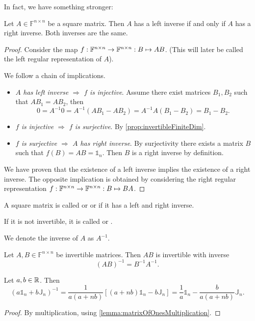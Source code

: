 In fact, we have something stronger:
\begin{lemma}
Let $A\in \mathbb{F}^{n\times n}$ be a square matrix. Then $A$ has a left inverse \textup{if and only if} $A$ has a right inverse. Both inverses are the same.
\end{lemma}
\begin{proof}
Consider the map $f:\mathbb{F}^{n\times n}\to \mathbb{F}^{n\times n}: B\mapsto AB$. (This will later be called the left regular representation of $A$). 
 
We follow a chain of implications.
\begin{itemize}
\item \textit{$A$ has left inverse $\Rightarrow$ $f$ is injective}. Assume there exist matrices $B_1,B_2$ such that $AB_1 = AB_2$, then
\[ 0 = A^{-1}0 = A^{-1}(AB_1-AB_2) = A^{-1}A(B_1-B_2) = B_1-B_2. \]
\item \textit{$f$ is injective $\Rightarrow$ $f$ is surjective}. By \ref{prop:invertibleFiniteDim}.
\item \textit{$f$ is surjective $\Rightarrow$ $A$ has right inverse}. By surjectivity there exists a matrix $B$ such that $f(B) = AB=\mathbb{1}_n$. Then $B$ is a right inverse by definition.
\end{itemize}
We have proven that the existence of a left inverse implies the existence of a right inverse. The opposite implication is obtained by considering the right regular representation $f:\mathbb{F}^{n\times n}\to \mathbb{F}^{n\times n}: B\mapsto BA$.
\end{proof}
\begin{definition}
A square matrix is called  or  or  if it has a left and right inverse.

If it is not invertible, it is called  or .

We denote the inverse of $A$ as $A^{-1}$.
\end{definition}
\begin{lemma}
Let $A,B\in \mathbb{F}^{n\times n}$ be invertible matrices. Then $AB$ is invertible with inverse
\[ (AB)^{-1} = B^{-1}A^{-1}. \]
\end{lemma}

\begin{lemma}
Let $a,b\in\mathbb{R}$. Then
\[ (a\mathbb{1}_n +b\mathbb{J}_n)^{-1} = \frac{1}{a(a+nb)}[(a+nb)\mathbb{1}_n -b\mathbb{J}_n] = \frac{1}{a}\mathbb{1}_n - \frac{b}{a(a+nb)}\mathbb{J}_n. \]
\end{lemma}
\begin{proof}
By multiplication, using \ref{lemma:matrixOfOnesMultiplication}.
\end{proof}

